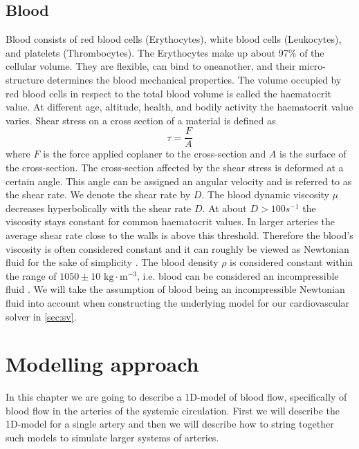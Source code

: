 \documentclass[a4paper, oneside]{discothesis}
\begin{document}
\section{Blood} \label{b}
Blood consists of red blood cells (Erythocytes), white blood cells (Leukocytes), and platelets (Thrombocytes).
The Erythocytes make up about 97\% of the cellular volume.
They are flexible, can bind to oneanother, and their micro-structure determines the blood mechanical properties.
The volume occupied by red blood cells in respect to the total blood volume is called the haematocrit value.
At different age, altitude, health, and bodily activity the haematocrit value varies.
Shear stress on a cross section of a material is defined as 
\begin{equation}
	\tau = \frac{F}{A}
\end{equation}
where $F$ is the force applied coplaner to the cross-section and $A$ is the surface of the cross-section.
The cross-section affected by the shear stress is deformed at a certain angle. 
This angle can be assigned an angular velocity and is referred to as the shear rate.
We denote the shear rate by $D$. \cite{köppl2023dimension}
The blood dynamic viscosity $\mu$ decreases hyperbolically with the shear rate $D$.
At about $D > 100s^{-1}$ the viscosity stays constant for common haematocrit values.
In larger arteries the average shear rate close to the walls is above this threshold. \cite{MCDbook}
Therefore the blood's viscosity is often considered constant and it can roughly be viewed as Newtonian fluid for the sake of simplicity \cite{fung1996biomechanics,guyton2006textbook,MCDbook,pedley_1980,zamir2000physics,zamir2006physics}. 
The blood density $\rho$ is considered constant within the range of $1050 \pm 10 \text{ kg}\cdot\text{m}^{-3}$, i.e. blood can be considered an incompressible fluid \cite{PMID:2658951,kenner1977continuous,helmig1997multiphase}.
We will take the assumption of blood being an incompressible Newtonian fluid into account when constructing the underlying model for our cardiovascular solver in \autoref{sec:sv}.

\chapter{Modelling approach} \label{chap:1dm}
In this chapter we are going to describe a 1D-model of blood flow, specifically of blood flow in the arteries of the systemic circulation.
First we will describe the 1D-model for a single artery and then we will describe how to string together such models to simulate larger systems of arteries.
\end{document}

